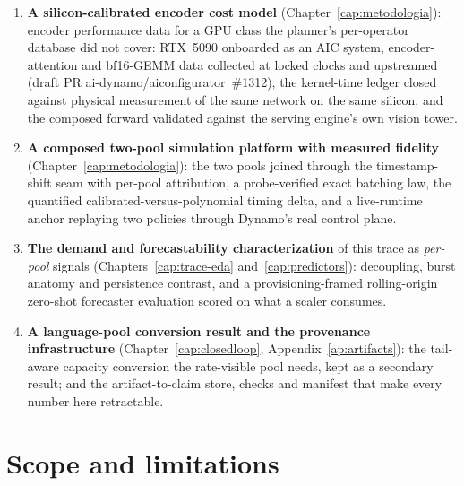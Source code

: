 \begin{enumerate}\setlength{\itemsep}{1pt}\setlength{\parskip}{0pt}
\item \textbf{A silicon-calibrated encoder cost model}
(Chapter~\ref{cap:metodologia}): encoder performance data for a GPU class
the planner's per-operator database did not cover: RTX~5090 onboarded as
an AIC system, encoder-attention and bf16-GEMM data collected at locked
clocks and upstreamed (draft PR ai-dynamo/aiconfigurator~\#1312), the
kernel-time ledger closed against physical measurement of the same network
on the same silicon, and the composed forward validated against the serving
engine's own vision tower.
\item \textbf{A composed two-pool simulation platform with measured
fidelity} (Chapter~\ref{cap:metodologia}): the two pools joined through the
timestamp-shift seam with per-pool attribution, a probe-verified exact
batching law, the quantified calibrated-versus-polynomial timing delta, and
a live-runtime anchor replaying two policies through Dynamo's real control
plane.
\item \textbf{The demand and forecastability characterization} of this trace
as \emph{per-pool} signals (Chapters~\ref{cap:trace-eda}
and~\ref{cap:predictors}): decoupling, burst anatomy and persistence
contrast, and a provisioning-framed rolling-origin zero-shot forecaster
evaluation scored on what a scaler consumes.
\item \textbf{A language-pool conversion result and the provenance
infrastructure} (Chapter~\ref{cap:closedloop}, Appendix~\ref{ap:artifacts}):
the tail-aware capacity conversion the rate-visible pool needs, kept as a
secondary result; and the artifact-to-claim store, checks and manifest that
make every number here retractable.
\end{enumerate}

\section{Scope and limitations}
\label{sec:intro-scope}

